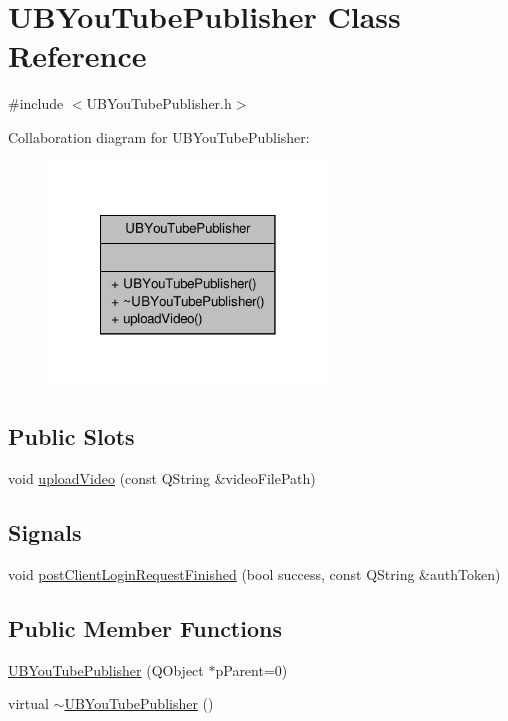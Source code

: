\hypertarget{class_u_b_you_tube_publisher}{\section{U\-B\-You\-Tube\-Publisher Class Reference}
\label{df/d84/class_u_b_you_tube_publisher}
}


{\ttfamily \#include $<$U\-B\-You\-Tube\-Publisher.\-h$>$}



Collaboration diagram for U\-B\-You\-Tube\-Publisher\-:
\nopagebreak
\begin{figure}[H]
\begin{center}
\leavevmode
\includegraphics[width=210pt]{d6/d57/class_u_b_you_tube_publisher__coll__graph}
\end{center}
\end{figure}
\subsection*{Public Slots}
\begin{DoxyCompactItemize}
\item 
void \hyperlink{class_u_b_you_tube_publisher_a56dcb4025c544233b4674c2db85da252}{upload\-Video} (const Q\-String \&video\-File\-Path)
\end{DoxyCompactItemize}
\subsection*{Signals}
\begin{DoxyCompactItemize}
\item 
void \hyperlink{class_u_b_you_tube_publisher_afd9ce2c8aeeb0b2d4d12d5c66757543b}{post\-Client\-Login\-Request\-Finished} (bool success, const Q\-String \&auth\-Token)
\end{DoxyCompactItemize}
\subsection*{Public Member Functions}
\begin{DoxyCompactItemize}
\item 
\hyperlink{class_u_b_you_tube_publisher_a65c18918dfc28628b4f93bf07b34a603}{U\-B\-You\-Tube\-Publisher} (Q\-Object $\ast$p\-Parent=0)
\item 
virtual \hyperlink{class_u_b_you_tube_publisher_a06d11b6b341314c2028e4625bc13a62f}{$\sim$\-U\-B\-You\-Tube\-Publisher} ()
\end{DoxyCompactItemize}


